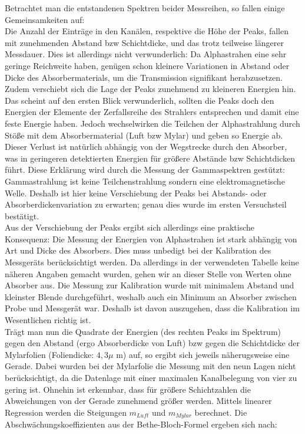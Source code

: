 Betrachtet man die entstandenen Spektren beider Messreihen, so fallen einige Gemeinsamkeiten auf:\\
Die Anzahl der Einträge in den Kanälen, respektive die Höhe der Peaks, fallen mit zunehmenden Abstand bzw Schichtdicke, und das trotz 
teilweise längerer Messdauer. Dies ist allerdings nicht verwunderlich: Da Alphastrahen eine sehr geringe Reichweite haben, genügen schon 
kleinere Variationen in Abstand oder Dicke des Absorbermaterials, um die Transmission signifikant herabzusetzen.\\
Zudem verschiebt sich die Lage der Peaks zunehmend zu kleineren Energien hin. Das scheint auf den ersten Blick verwunderlich, sollten 
die Peaks doch den Energien der Elemente der Zerfallsreihe des Strahlers entsprechen und damit eine feste Energie haben. Jedoch 
wechselwirken die Teilchen der Alphastrahlung durch Stöße mit dem Absorbermaterial (Luft bzw Mylar) und geben so Energie ab. Dieser 
Verlust ist natürlich abhängig von der Wegstrecke durch den Absorber, was in geringeren detektierten Energien für größere Abstände 
bzw Schichtdicken führt. Diese Erklärung wird durch die Messung der Gammaspektren gestützt: Gammastrahlung ist keine Teilchenstrahlung 
sondern eine elektromagnetische Welle. Deshalb ist hier keine Verschiebung der Peaks bei Abstands- oder Absorberdickenvariation zu 
erwarten; genau dies wurde im ersten Versuchsteil bestätigt.\\
Aus der Verschiebung der Peaks ergibt sich allerdings eine praktische Konsequenz: Die Messung der Energien von Alphastrahen ist stark 
abhängig von Art und Dicke des Absorbers. Dies muss unbedigt bei der Kalibration des Messgeräts berücksichtigt werden. Da allerdings 
in der verwendeten Tabelle keine näheren Angaben gemacht wurden, gehen wir an dieser Stelle von Werten ohne Absorber aus. Die Messung 
zur Kalibration wurde mit minimalem Abstand und kleinster Blende durchgeführt, weshalb auch ein Minimum an Absorber zwischen Probe 
und Messgerät war. Deshalb ist davon auszugehen, dass die Kalibration im Wesentlichen richtig ist.\\

Trägt man nun die Quadrate der Energien (des rechten Peaks im Spektrum) gegen den Abstand (ergo Absorberdicke von Luft) bzw 
gegen die Schichtdicke der Mylarfolien (Foliendicke: $4,3 \mu$ m) auf, so ergibt sich jeweils näherugsweise eine Gerade. Dabei wurden 
bei der Mylarfolie die Messung mit den neun Lagen nicht berücksichtigt, da die Datenlage mit einer maximalen Kanalbelegung von vier zu 
gering ist. Ohnehin ist erkennbar, dass für größere Schichtzahlen die Abweichungen von der Gerade zunehmend größer werden. Mittels 
linearer Regression werden die Steigungen $m_{Luft}$ und $m_{Mylar}$ berechnet. Die Abschwächungskoeffizienten aus der 
Bethe-Bloch-Formel ergeben sich nach: \\

